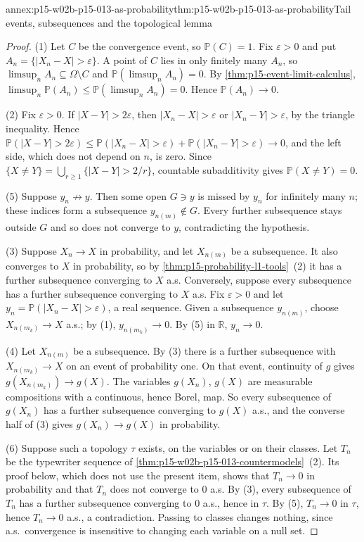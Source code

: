 \begin{annexitem}{annex:p15-w02b-p15-013-as-probability}{thm:p15-w02b-p15-013-as-probability}{Tail events, subsequences and the topological lemma}
\begin{proof}
(1) Let \(C\) be the convergence event, so \(\mathbb P(C)=1\). Fix
\(\varepsilon>0\) and put \(A_n=\{|X_n-X|>\varepsilon\}\). A point of
\(C\) lies in only finitely many \(A_n\), so
\(\limsup_nA_n\subseteq\Omega\setminus C\) and
\(\mathbb P(\limsup_nA_n)=0\). By
\cref{thm:p15-event-limit-calculus},
\(\limsup_n\mathbb P(A_n)\leq\mathbb P(\limsup_nA_n)=0\). Hence
\(\mathbb P(A_n)\to0\).

(2) Fix \(\varepsilon>0\). If \(|X-Y|>2\varepsilon\), then
\(|X_n-X|>\varepsilon\) or \(|X_n-Y|>\varepsilon\), by the triangle
inequality. Hence
\(\mathbb P(|X-Y|>2\varepsilon)\leq\mathbb P(|X_n-X|>\varepsilon)
+\mathbb P(|X_n-Y|>\varepsilon)\to0\), and the left side, which does
not depend on \(n\), is zero. Since
\(\{X\neq Y\}=\bigcup_{r\geq1}\{|X-Y|>2/r\}\), countable subadditivity
gives \(\mathbb P(X\neq Y)=0\).

(5) Suppose \(y_n\not\to y\). Then some open \(G\ni y\) is missed by
\(y_n\) for infinitely many \(n\); these indices form a subsequence
\(y_{n(m)}\notin G\). Every further subsequence stays outside \(G\) and
so does not converge to \(y\), contradicting the hypothesis.

(3) Suppose \(X_n\to X\) in probability, and let \(X_{n(m)}\) be a
subsequence. It also converges to \(X\) in probability, so by
\cref{thm:p15-probability-l1-tools}~(2) it has a further subsequence
converging to \(X\) a.s. Conversely, suppose every subsequence has a
further subsequence converging to \(X\) a.s. Fix \(\varepsilon>0\) and
let \(y_n=\mathbb P(|X_n-X|>\varepsilon)\), a real sequence. Given a
subsequence \(y_{n(m)}\), choose \(X_{n(m_k)}\to X\) a.s.; by (1),
\(y_{n(m_k)}\to0\). By (5) in \(\mathbb R\), \(y_n\to0\).

(4) Let \(X_{n(m)}\) be a subsequence. By (3) there is a further
subsequence with \(X_{n(m_k)}\to X\) on an event of probability one.
On that event, continuity of \(g\) gives
\(g(X_{n(m_k)})\to g(X)\). The variables \(g(X_n)\), \(g(X)\) are
measurable compositions with a continuous, hence Borel, map. So every
subsequence of \(g(X_n)\) has a further subsequence converging to
\(g(X)\) a.s., and the converse half of (3) gives
\(g(X_n)\to g(X)\) in probability.

(6) Suppose such a topology \(\tau\) exists, on the variables or on
their classes. Let \(T_n\) be the typewriter sequence of
\cref{thm:p15-w02b-p15-013-countermodels}~(2). Its proof below,
which does not use the present item, shows that
\(T_n\to0\) in probability and that \(T_n\) does not converge to \(0\)
a.s. By (3), every subsequence of \(T_n\) has a further subsequence
converging to \(0\) a.s., hence in \(\tau\). By (5), \(T_n\to0\) in
\(\tau\), hence \(T_n\to0\) a.s., a contradiction. Passing to classes
changes nothing, since a.s.\ convergence is insensitive to changing
each variable on a null set.


\end{proof}
\end{annexitem}
